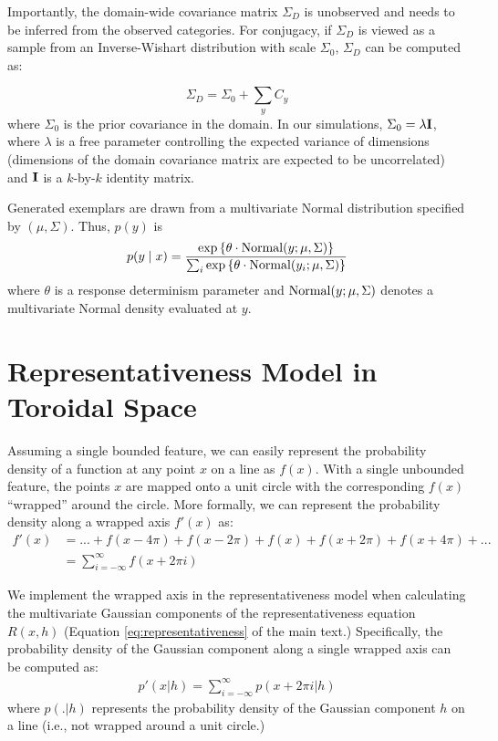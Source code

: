 \documentclass[12pt]{article}
\begin{document}
Importantly, the domain-wide covariance matrix $\Sigma_D$ is unobserved and
needs to be inferred from the observed categories. For conjugacy, if $\Sigma_D$
is viewed as a sample from an Inverse-Wishart distribution with scale
$\Sigma_0$, $\Sigma_D$ can be computed as:

 \begin{equation} \Sigma_D = \Sigma_0 + \sum_y{C_y}
    \label{eq:category_sigmas}
\end{equation}
% 
where $\Sigma_0$ is the prior covariance in the domain. In our simulations,
$\Sigma_0 = \lambda {\bf I}$, where $\lambda$ is a free parameter controlling
the expected variance of dimensions (dimensions of the domain covariance matrix
are expected to be uncorrelated) and ${\bf I}$ is a $k$-by-$k$ identity matrix.

Generated exemplars are drawn from a multivariate Normal distribution specified
by $(\mu, \Sigma)$. Thus, $p(y)$ is
\begin{equation} p(y \mid x) = \dfrac {\exp \left \{ \theta \cdot {\rm
Normal}(y; \mu, \Sigma) \right \} } {\sum_i \exp \left \{ \theta \cdot {\rm
Normal}(y_i; \mu, \Sigma) \right \} }
\end{equation}
% 
where $\theta$ is a response determinism parameter and ${\rm Normal}(y; \mu,
\Sigma)$ denotes a multivariate Normal density evaluated at $y$.

\newpage
\section{Representativeness Model in Toroidal Space}
\label{ap:wrapgauss}

Assuming a single bounded feature, we can easily represent the probability
density of a function at any point $x$ on a line as $f(x)$. With a single
unbounded feature, the points $x$ are mapped onto a unit circle with the
corresponding $f(x)$ ``wrapped'' around the circle. More formally, we can
represent the probability density along a wrapped axis $f'(x)$ as:
\begin{align}
f'(x) &= ... + f(x-4\pi) + f(x-2\pi) + f(x) + f(x+2\pi) + f(x+4\pi) + ...\\
     &= \sum_{i=-\infty}^{\infty} f(x + 2\pi i)
\end{align}

We implement the wrapped axis in the representativeness model when
calculating the multivariate Gaussian components of the representativeness equation
$R(x,h)$ (Equation \ref{eq:representativeness} of the main text.) Specifically,
the probability density of the Gaussian component along a single wrapped axis can be computed as:
\begin{align}
p'(x|h) = \sum_{i=-\infty}^{\infty} p(x + 2\pi i|h)
\end{align}
where $p(.|h)$ represents the probability density of the Gaussian component $h$
on a line (i.e., not wrapped around a unit circle.)
\end{document}
